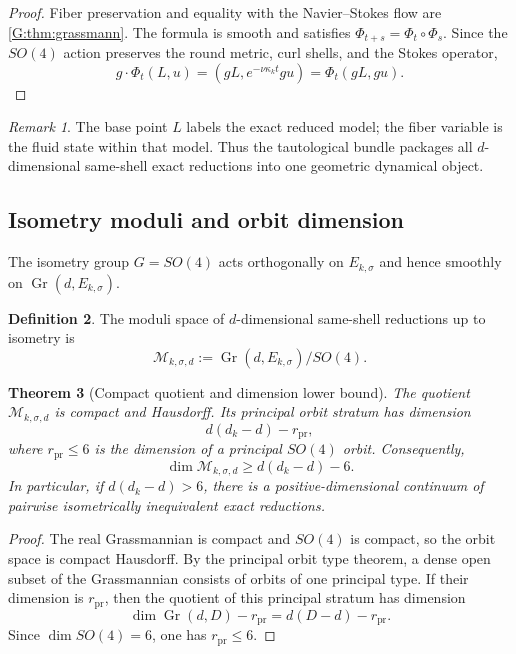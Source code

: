 \documentclass[
 aps,
 prd,
 reprint,
 amsmath,
 amssymb,
 nofootinbib,
 superscriptaddress
]{revtex4-2}
\newtheorem{theorem}{Theorem}[section]
\theoremstyle{definition}
\newtheorem{definition}[theorem]{Definition}
\theoremstyle{remark}
\newtheorem{remark}[theorem]{Remark}
\newcommand{\cM}{\mathscr M}
\newcommand{\Gr}{\operatorname{Gr}}
\begin{document}
\begin{proof}
Fiber preservation and equality with the Navier--Stokes flow are
\cref{G:thm:grassmann}.  The formula is smooth and satisfies
$\Phi_{t+s}=\Phi_t\circ\Phi_s$.  Since the $SO(4)$ action preserves the round
metric, curl shells, and the Stokes operator,
\[
 g\cdot\Phi_t(L,u)
 =
 (gL,e^{-\nu\kappa_k t}gu)
 =
 \Phi_t(gL,gu).
\]
\end{proof}

\begin{remark}
The base point $L$ labels the exact reduced model; the fiber variable is the
fluid state within that model.  Thus the tautological bundle packages all
$d$-dimensional same-shell exact reductions into one geometric dynamical
object.
\end{remark}

\subsection{Isometry moduli and orbit dimension}

The isometry group $G=SO(4)$ acts orthogonally on $E_{k,\sigma}$ and hence
smoothly on $\Gr(d,E_{k,\sigma})$.

\begin{definition}
The moduli space of $d$-dimensional same-shell reductions up to isometry is
\begin{equation}
 \cM_{k,\sigma,d}
 :=
 \Gr(d,E_{k,\sigma})/SO(4).
 \label{G:eq:moduli}
\end{equation}
\end{definition}

\begin{theorem}[Compact quotient and dimension lower bound]
\label{G:thm:moddim}
The quotient $\cM_{k,\sigma,d}$ is compact and Hausdorff.  Its principal
orbit stratum has dimension
\begin{equation}
 d(d_k-d)-r_{\mathrm{pr}},
 \label{G:eq:principalmoddim}
\end{equation}
where $r_{\mathrm{pr}}\le6$ is the dimension of a principal $SO(4)$ orbit.
Consequently,
\begin{equation}
 \boxed{
 \dim\cM_{k,\sigma,d}
 \ge
 d(d_k-d)-6.
 }
 \label{G:eq:modlower}
\end{equation}
In particular, if $d(d_k-d)>6$, there is a positive-dimensional continuum
of pairwise isometrically inequivalent exact reductions.
\end{theorem}

\begin{proof}
The real Grassmannian is compact and $SO(4)$ is compact, so the orbit space
is compact Hausdorff.  By the principal orbit type theorem, a dense open
subset of the Grassmannian consists of orbits of one principal type.  If
their dimension is $r_{\mathrm{pr}}$, then the quotient of this principal
stratum has dimension
\[
      \dim\Gr(d,D)-r_{\mathrm{pr}}
      =
      d(D-d)-r_{\mathrm{pr}}.
\]
Since $\dim SO(4)=6$, one has $r_{\mathrm{pr}}\le6$.
\end{proof}
\end{document}
